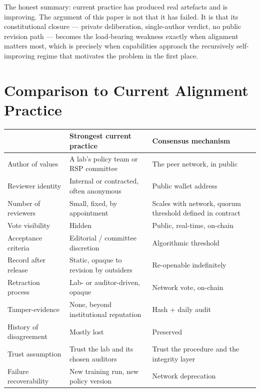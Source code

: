 \documentclass[11pt,a4paper]{article}
\begin{document}
The honest summary: current practice has produced real artefacts
and is improving. The argument of this paper is not that it has
failed. It is that its constitutional closure --- private
deliberation, single-author verdict, no public revision path ---
becomes the load-bearing weakness exactly when alignment matters
most, which is precisely when capabilities approach the
recursively self-improving regime that motivates the problem in
the first place.

\section{Comparison to Current Alignment Practice}

\begin{plainbox}
\begin{tabular}{@{}p{3.7cm} p{4.8cm} p{5.7cm}@{}}
\toprule
                           & \textbf{Strongest current practice}             & \textbf{Consensus mechanism} \\
\midrule
Author of values           & A lab's policy team or RSP committee            & The peer network, in public \\
Reviewer identity          & Internal or contracted, often anonymous         & Public wallet address \\
Number of reviewers        & Small, fixed, by appointment                    & Scales with network, quorum threshold defined in contract \\
Vote visibility            & Hidden                                          & Public, real-time, on-chain \\
Acceptance criteria        & Editorial / committee discretion                & Algorithmic threshold \\
Record after release       & Static, opaque to revision by outsiders         & Re-openable indefinitely \\
Retraction process         & Lab- or auditor-driven, opaque                  & Network vote, on-chain \\
Tamper-evidence            & None, beyond institutional reputation           & Hash + daily audit \\
History of disagreement    & Mostly lost                                     & Preserved \\
Trust assumption           & Trust the lab and its chosen auditors           & Trust the procedure and the integrity layer \\
Failure recoverability     & New training run, new policy version            & Network deprecation \\
\bottomrule
\end{tabular}
\end{plainbox}
\end{document}
